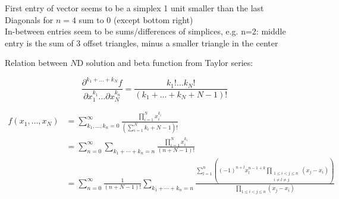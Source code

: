 \documentclass{article}
\begin{document}
First entry of vector seems to be a simplex 1 unit smaller than the last \\
Diagonals for $n=4$ sum to 0 (except bottom right) \\
In-between entries seem to be sums/differences of simplices,
e.g. n=2: middle entry is the sum of 3 offset triangles,
minus a smaller triangle in the center

\newpage

Relation between $N$D solution and beta function from Taylor series:

\[\frac{\partial^{k_1+\ldots+k_N}f}{\partial x_1^{k_1}\ldots\partial x_N^{k_n}}
= \frac{k_1! \ldots k_N!}{(k_1+\ldots+k_N+N-1)!}\]

\begin{align*}
  f(x_1, \ldots, x_N) &= \sum_{k_1, \ldots, k_n = 0}^\infty
  \frac{\prod\limits_{i=1}^Nx_i^{k_i}}{\left(\sum_{i=1}^Nk_i+N-1\right)!} \\
  &= \sum_{n=0}^\infty \sum_{k_1+\cdots+k_n=n}
  \frac{\prod\limits_{i=1}^Nx_i^{k_i}}{(n+N-1)!} \\
  &=
  \sum_{n=0}^\infty \frac{1}{(n+N-1)!} \sum_{k_1+\cdots+k_n=n}
  \frac{\sum\limits_{l=1}^n\left((-1)^{n+l}x_l^{n-1+k}\prod\limits_{\substack{1 \leq i < j \leq n \\ i \neq l \neq j}}(x_j-x_i)\right)}{\prod\limits_{1 \leq i < j \leq n} (x_j-x_i)}
\end{align*}
\end{document}
